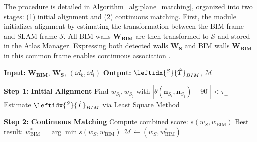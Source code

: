 \label{sec:wall_matching}
The procedure is detailed in Algorithm~\ref{alg:plane_matching}, organized into two stages: (1) initial alignment and (2) continuous matching. First, the module initializes alignment by estimating the transformation  between the BIM frame and SLAM frame $\mathcal{S}$. All BIM walls $\mathbf{W_{\text{BIM}}}$  are then transformed to $\mathcal{S}$ and stored in the Atlas Manager. Expressing both detected walls $\mathbf{W_S}$ and BIM walls $\mathbf{W_{\text{BIM}}}$  in this common frame enables  continuous association .


\begin{algorithm}[h]
\caption{Wall Matching Procedure}
\label{alg:plane_matching}
\begin{algorithmic}[1]
\State \textbf{Input:} $\mathbf{W_{\text{BIM}}}$, $\mathbf{W_S}$, $(id_k, id_l)$
\State \textbf{Output:} $\leftidx{^S}{\hat{T}}_{BIM}$, $\mathcal{M}$

\medskip
\State \textbf{Step 1: Initial Alignment}
\Repeat
   \State Find $w_{S_i}, w_{S_j}$ with $|\theta(\mathbf{n}_{S_i}, \mathbf{n}_{S_j}) - 90^\circ| < \tau_\perp$
    \State Estimate $\leftidx{^S}{\hat{T}}_{BIM}$ via Least Square Method

\medskip
\State \textbf{Step 2: Continuous Matching}
    \State Compute combined score: $s(w_S,w_{\text{BIM}})$
    \State Best result: $w_{\text{BIM}}^\ast = \arg\min s(w_S,w_{\text{BIM}})$
    \State $\mathcal{M} \leftarrow (w_S, w_{\text{BIM}}^\ast)$
    \EndFor  
\EndFor
\end{algorithmic}
\end{algorithm}


